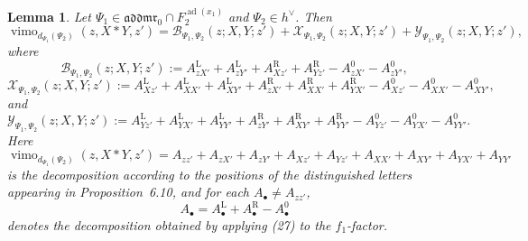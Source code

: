 \documentclass[10pt,a4paper]{amsart}
\newtheorem{lem}{Lemma}
\newcommand{\addmr}{\mathfrak{addmr}}
\DeclareMathOperator{\vimo}{vimo}
\begin{document}
\begin{lem}
Let $\Psi_1 \in \addmr_0 \cap F_2^{\operatorname{ad}(x_1)}$ and $\Psi_2 \in h^\vee$.
Then
\[
\vimo_{d_{\Psi_1}(\Psi_2)}(z,X*Y,z')
=
\mathcal{B}_{\Psi_1,\Psi_2}(z;X,Y;z')
+
\mathcal{X}_{\Psi_1,\Psi_2}(z;X,Y;z')
+
\mathcal{Y}_{\Psi_1,\Psi_2}(z;X,Y;z'),
\]
where
\[
\mathcal{B}_{\Psi_1,\Psi_2}(z;X,Y;z')
:=
A_{zX'}^{\mathrm{L}}+A_{zY'}^{\mathrm{L}}+A_{Xz'}^{\mathrm{R}}+A_{Yz'}^{\mathrm{R}}
-
A_{zX'}^{0}-A_{zY'}^{0},
\]
\[
\mathcal{X}_{\Psi_1,\Psi_2}(z;X,Y;z')
:=
A_{Xz'}^{\mathrm{L}}+A_{XX'}^{\mathrm{L}}+A_{XY'}^{\mathrm{L}}
+
A_{zX'}^{\mathrm{R}}+A_{XX'}^{\mathrm{R}}+A_{YX'}^{\mathrm{R}}
-
A_{Xz'}^{0}-A_{XX'}^{0}-A_{XY'}^{0},
\]
and
\[
\mathcal{Y}_{\Psi_1,\Psi_2}(z;X,Y;z')
:=
A_{Yz'}^{\mathrm{L}}+A_{YX'}^{\mathrm{L}}+A_{YY'}^{\mathrm{L}}
+
A_{zY'}^{\mathrm{R}}+A_{XY'}^{\mathrm{R}}+A_{YY'}^{\mathrm{R}}
-
A_{Yz'}^{0}-A_{YX'}^{0}-A_{YY'}^{0}.
\]
Here
\[
\vimo_{d_{\Psi_1}(\Psi_2)}(z,X*Y,z')
=
A_{zz'}+A_{zX'}+A_{zY'}+A_{Xz'}+A_{Yz'}+A_{XX'}+A_{XY'}+A_{YX'}+A_{YY'}
\]
is the decomposition according to the positions of the distinguished letters
appearing in Proposition~6.10, and for each $A_{\bullet}\neq A_{zz'}$,
\[
A_{\bullet}=A_{\bullet}^{\mathrm{L}}+A_{\bullet}^{\mathrm{R}}-A_{\bullet}^{0}
\]
denotes the decomposition obtained by applying \emph{(27)} to the $f_1$-factor.
\end{lem}
\end{document}
